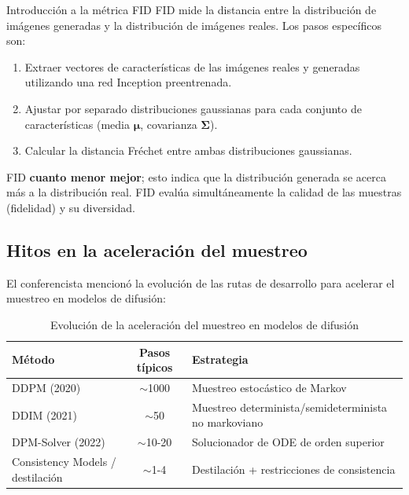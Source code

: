 \documentclass[a4paper]{article}
\begin{document}
\begin{knowledgebox}{Introducción a la métrica FID}
FID mide la distancia entre la distribución de imágenes generadas y la distribución de imágenes reales. Los pasos específicos son:
\begin{enumerate}
    \item Extraer vectores de características de las imágenes reales y generadas utilizando una red Inception preentrenada.
    \item Ajustar por separado distribuciones gaussianas para cada conjunto de características (media $\boldsymbol{\mu}$, covarianza $\boldsymbol{\Sigma}$).
    \item Calcular la distancia Fr\'{e}chet entre ambas distribuciones gaussianas.
\end{enumerate}
FID \textbf{cuanto menor mejor}; esto indica que la distribución generada se acerca más a la distribución real. FID evalúa simultáneamente la calidad de las muestras (fidelidad) y su diversidad.
\end{knowledgebox}

\subsection{Hitos en la aceleración del muestreo}

El conferencista mencionó la evolución de las rutas de desarrollo para acelerar el muestreo en modelos de difusión:

\begin{table}[H]
\centering
\caption{Evolución de la aceleración del muestreo en modelos de difusión}
\begin{tabular}{lcl}
\toprule
\textbf{Método} & \textbf{Pasos típicos} & \textbf{Estrategia} \\
\midrule
DDPM (2020) & $\sim$1000 & Muestreo estocástico de Markov \\
DDIM (2021) & $\sim$50 & Muestreo determinista/semideterminista no markoviano \\
DPM-Solver (2022) & $\sim$10-20 & Solucionador de ODE de orden superior \\
Consistency Models / destilación & $\sim$1-4 & Destilación + restricciones de consistencia \\
\bottomrule
\end{tabular}
\end{table}
\end{document}
